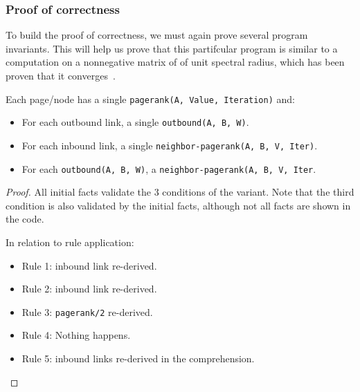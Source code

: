 \subsubsection{Proof of correctness}

To build the proof of correctness, we must again prove several program
invariants. This will help us prove that this partifcular program is similar to
a computation on a nonnegative matrix of of unit spectral radius, which has been
proven that it converges~\cite{DBLP:journals/corr/abs-cs-0606047,
Lubachevsky:1986:CAA:4904.4801}.

\begin{invariant}
Each page/node has a single \texttt{pagerank(A, Value, Iteration)} and:
\begin{itemize}
   \item For each outbound link, a single \texttt{\bang outbound(A, B, W)}.
   \item For each inbound link, a single \texttt{neighbor-pagerank(A, B, V, Iter)}.
   \item For each \texttt{\bang outbound(A, B, W)}, a \texttt{neighbor-pagerank(A,
      B, V, Iter}.
\end{itemize}
\end{invariant}

\begin{proof}

All initial facts validate the 3 conditions of the variant. Note that the third
condition is also validated by the initial facts, although not all facts are shown in
the code.

In relation to rule application:

\begin{itemize}
   \item Rule 1: inbound link re-derived.
   \item Rule 2: inbound link re-derived.
   \item Rule 3: \texttt{pagerank/2} re-derived.
   \item Rule 4: Nothing happens.
   \item Rule 5: inbound links re-derived in the comprehension.
\end{itemize}
\end{proof}


